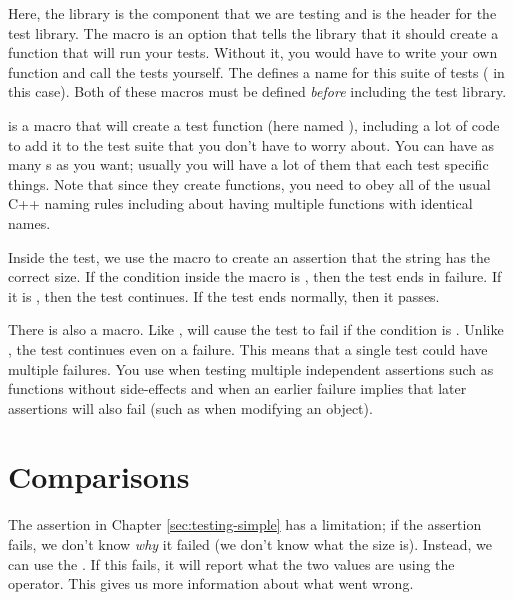Here, the  library is the component that we are testing and  is the header for the test library.
The  macro is an option that tells the library that it should create a  function that will run your tests.
Without it, you would have to write your own  function and call the tests yourself.
The  defines a name for this suite of tests ( in this case).
Both of these macros must be defined \emph{before} including the test library.

 is a macro that will create a test function (here named ), including a lot of code to add it to the test suite that you don't have to worry about.
You can have as many s as you want;
usually you will have a lot of them that each test specific things.
Note that since they create functions, you need to obey all of the usual C++ naming rules including about having multiple functions with identical names.

Inside the test, we use the  macro to create an assertion that the string has the correct size.
If the condition inside the macro is , then the test ends in failure.
If it is , then the test continues.
If the test ends normally, then it passes.

There is also a  macro.
Like ,  will cause the test to fail if the condition is .
Unlike , the test continues even on a failure.
This means that a single test could have multiple failures.
You use  when testing multiple independent assertions such as functions without side-effects
and  when an earlier failure implies that later assertions will also fail (such as when modifying an object).


\section{Comparisons}\label{sec:testing-compare}

The assertion in Chapter \ref{sec:testing-simple} has a limitation;
if the assertion fails, we don't know \emph{why} it failed (we don't know what the size is).
Instead, we can use the .
If this fails, it will report what the two values are using the \oplshift operator.
This gives us more information about what went wrong.

